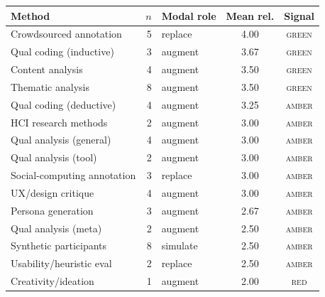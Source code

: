 \begin{tabular}{@{}l r l c c@{}}
\toprule
Method & $n$ & Modal role & Mean rel. & Signal \\
\midrule
Crowdsourced annotation & 5 & replace & 4.00 & \cellcolor{g!55}\textsc{green} \\
Qual coding (inductive) & 3 & augment & 3.67 & \cellcolor{g!55}\textsc{green} \\
Content analysis & 4 & augment & 3.50 & \cellcolor{g!55}\textsc{green} \\
Thematic analysis & 8 & augment & 3.50 & \cellcolor{g!55}\textsc{green} \\
Qual coding (deductive) & 4 & augment & 3.25 & \cellcolor{a!60}\textsc{amber} \\
HCI research methods & 2 & augment & 3.00 & \cellcolor{a!60}\textsc{amber} \\
Qual analysis (general) & 4 & augment & 3.00 & \cellcolor{a!60}\textsc{amber} \\
Qual analysis (tool) & 2 & augment & 3.00 & \cellcolor{a!60}\textsc{amber} \\
Social-computing annotation & 3 & replace & 3.00 & \cellcolor{a!60}\textsc{amber} \\
UX/design critique & 4 & augment & 3.00 & \cellcolor{a!60}\textsc{amber} \\
Persona generation & 3 & augment & 2.67 & \cellcolor{a!60}\textsc{amber} \\
Qual analysis (meta) & 2 & augment & 2.50 & \cellcolor{a!60}\textsc{amber} \\
Synthetic participants & 8 & simulate & 2.50 & \cellcolor{a!60}\textsc{amber} \\
Usability/heuristic eval & 2 & replace & 2.50 & \cellcolor{a!60}\textsc{amber} \\
Creativity/ideation & 1 & augment & 2.00 & \cellcolor{r!55}\textsc{red} \\
\bottomrule
\end{tabular}
